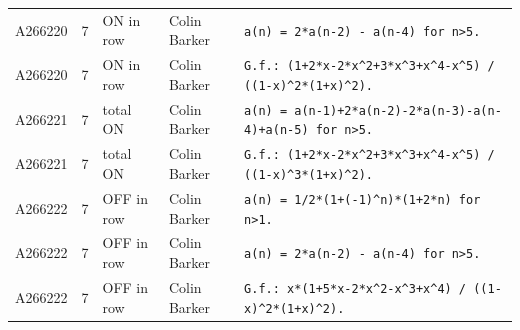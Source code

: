 \documentclass[11pt]{article}
\theoremstyle{definition}
\theoremstyle{remark}
\begin{document}
{\begin{longtable}{p{1.3cm}p{0.7cm}p{2.4cm}p{2.3cm}p{7.3cm}}
A266220 & 7 & ON in row & Colin Barker & \texttt{a(n)\allowbreak{} \allowbreak{}=\allowbreak{} \allowbreak{}2*\allowbreak{}a(n-\allowbreak{}2)\allowbreak{} \allowbreak{}-\allowbreak{} \allowbreak{}a(n-\allowbreak{}4)\allowbreak{} \allowbreak{}for \allowbreak{}n>5.} \\
A266220 & 7 & ON in row & Colin Barker & \texttt{G.f.: \allowbreak{}(1+\allowbreak{}2*\allowbreak{}x-\allowbreak{}2*\allowbreak{}x\^{}2+\allowbreak{}3*\allowbreak{}x\^{}3+\allowbreak{}x\^{}4-\allowbreak{}x\^{}5)\allowbreak{} \allowbreak{}/\allowbreak{} \allowbreak{}((1-\allowbreak{}x)\allowbreak{}\^{}2*\allowbreak{}(1+\allowbreak{}x)\allowbreak{}\^{}2)\allowbreak{}.} \\
A266221 & 7 & total ON & Colin Barker & \texttt{a(n)\allowbreak{} \allowbreak{}=\allowbreak{} \allowbreak{}a(n-\allowbreak{}1)\allowbreak{}+\allowbreak{}2*\allowbreak{}a(n-\allowbreak{}2)\allowbreak{}-\allowbreak{}2*\allowbreak{}a(n-\allowbreak{}3)\allowbreak{}-\allowbreak{}a(n-\allowbreak{}4)\allowbreak{}+\allowbreak{}a(n-\allowbreak{}5)\allowbreak{} \allowbreak{}for \allowbreak{}n>5.} \\
A266221 & 7 & total ON & Colin Barker & \texttt{G.f.: \allowbreak{}(1+\allowbreak{}2*\allowbreak{}x-\allowbreak{}2*\allowbreak{}x\^{}2+\allowbreak{}3*\allowbreak{}x\^{}3+\allowbreak{}x\^{}4-\allowbreak{}x\^{}5)\allowbreak{} \allowbreak{}/\allowbreak{} \allowbreak{}((1-\allowbreak{}x)\allowbreak{}\^{}3*\allowbreak{}(1+\allowbreak{}x)\allowbreak{}\^{}2)\allowbreak{}.} \\
A266222 & 7 & OFF in row & Colin Barker & \texttt{a(n)\allowbreak{} \allowbreak{}=\allowbreak{} \allowbreak{}1/\allowbreak{}2*\allowbreak{}(1+\allowbreak{}(-\allowbreak{}1)\allowbreak{}\^{}n)\allowbreak{}*\allowbreak{}(1+\allowbreak{}2*\allowbreak{}n)\allowbreak{} \allowbreak{}for \allowbreak{}n>1.} \\
A266222 & 7 & OFF in row & Colin Barker & \texttt{a(n)\allowbreak{} \allowbreak{}=\allowbreak{} \allowbreak{}2*\allowbreak{}a(n-\allowbreak{}2)\allowbreak{} \allowbreak{}-\allowbreak{} \allowbreak{}a(n-\allowbreak{}4)\allowbreak{} \allowbreak{}for \allowbreak{}n>5.} \\
A266222 & 7 & OFF in row & Colin Barker & \texttt{G.f.: \allowbreak{}x*\allowbreak{}(1+\allowbreak{}5*\allowbreak{}x-\allowbreak{}2*\allowbreak{}x\^{}2-\allowbreak{}x\^{}3+\allowbreak{}x\^{}4)\allowbreak{} \allowbreak{}/\allowbreak{} \allowbreak{}((1-\allowbreak{}x)\allowbreak{}\^{}2*\allowbreak{}(1+\allowbreak{}x)\allowbreak{}\^{}2)\allowbreak{}.} \\

\end{longtable}}
\end{document}
